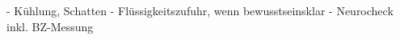 
\begin{itemize}
  -   Kühlung, Schatten
  -   Flüssigkeitszufuhr, wenn bewusstseinsklar
  -   Neurocheck inkl. BZ-Messung
\end{itemize}